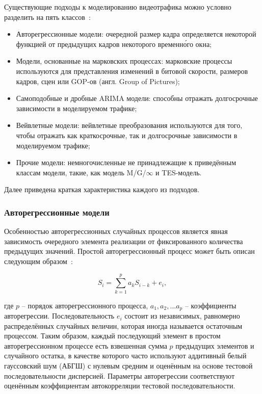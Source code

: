 Существующие подходы к моделированию видеотрафика можно условно
разделить на пять классов~\cite{survey2013}:

\begin{itemize}
    \item Авторегрессионные модели: очередной размер кадра
        определяется некоторой функцией от предыдущих кадров
        некоторого временн\'{о}го окна;
    \item Модели, основанные на марковских процессах: марковские
        процессы используются для представления изменений
        в битовой скорости, размеров кадров, сцен или GOP-ов
        (англ. Group of Pictures);
    \item Самоподобные и дробные ARIMA модели: способны отражать
        долгосрочные зависимости в моделируемом трафике;
    \item Вейвлетные модели: вейвлетные преобразования используются
        для того, чтобы отражать как краткосрочные, так и долгосрочные
        зависимости в моделируемом трафике;
    \item Прочие модели: немногочисленные не принадлежащие к
        приведённым классам модели, такие, как модель M/G/$\infty$
        и TES-модель.
\end{itemize}
\hspace{5pt}

Далее приведена краткая характеристика каждого из подходов.

\subsubsection{Авторегрессионные модели}
\hspace{3pt}

Особенностью авторегрессионных случайных процессов является
явная зависимость очередного элемента реализации от фиксированного
количества предыдущих значений. Простой авторегрессионный процесс может
быть описан следующим образом~\cite{ars2004, survey2013}:

\begin{equation}
    S_i = \sum_{k=1}^p a_k S_{i - k} + e_i,
\end{equation}

где $p$ -- порядок авторегрессионного процесса, $a_1, a_2, \dots a_p$ -- коэффициенты
авторегрессии. Последовательность $e_i$ состоит из независимых, равномерно
распределённых случайных величин, которая иногда называется остаточным процессом.
Таким образом, каждый последующий элемент в простом авторегрессионном процессе
есть взвешенная сумма $p$ предыдущих элементов и случайного остатка, в качестве
которого часто используют аддитивный белый гауссовский шум (АБГШ) с нулевым средним
и оценённым на основе тестовой последовательности дисперсией. Параметры авторегрессии
соответствуют оценённым коэффициентам автокорреляции тестовой последовательности.

